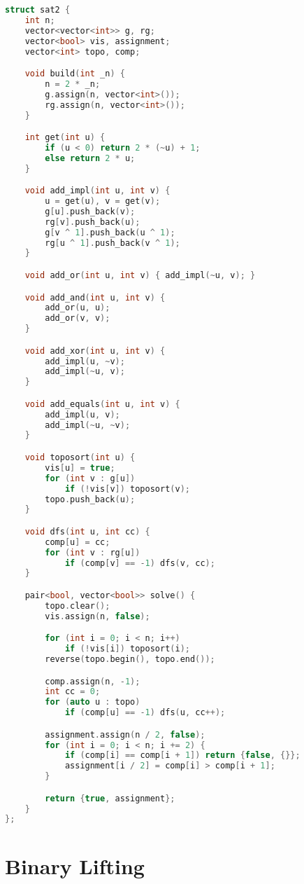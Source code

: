 \documentclass[10pt, a4paper, oneside]{book}
\begin{document}
\begin{lstlisting}[language=C++]
struct sat2 {
    int n;
    vector<vector<int>> g, rg;
    vector<bool> vis, assignment;
    vector<int> topo, comp;

    void build(int _n) {
        n = 2 * _n;
        g.assign(n, vector<int>());
        rg.assign(n, vector<int>());
    }

    int get(int u) {
        if (u < 0) return 2 * (~u) + 1;
        else return 2 * u;
    }

    void add_impl(int u, int v) {
        u = get(u), v = get(v);
        g[u].push_back(v);
        rg[v].push_back(u);
        g[v ^ 1].push_back(u ^ 1);
        rg[u ^ 1].push_back(v ^ 1);
    }

    void add_or(int u, int v) { add_impl(~u, v); }

    void add_and(int u, int v) {
        add_or(u, u);
        add_or(v, v);
    }

    void add_xor(int u, int v) {
        add_impl(u, ~v);
        add_impl(~u, v);
    }

    void add_equals(int u, int v) {
        add_impl(u, v);
        add_impl(~u, ~v);
    }

    void toposort(int u) {
        vis[u] = true;
        for (int v : g[u])
            if (!vis[v]) toposort(v);
        topo.push_back(u);
    }

    void dfs(int u, int cc) {
        comp[u] = cc;
        for (int v : rg[u])
            if (comp[v] == -1) dfs(v, cc);
    }

    pair<bool, vector<bool>> solve() {
        topo.clear();
        vis.assign(n, false);

        for (int i = 0; i < n; i++)
            if (!vis[i]) toposort(i);
        reverse(topo.begin(), topo.end());

        comp.assign(n, -1);
        int cc = 0;
        for (auto u : topo)
            if (comp[u] == -1) dfs(u, cc++);

        assignment.assign(n / 2, false);
        for (int i = 0; i < n; i += 2) {
            if (comp[i] == comp[i + 1]) return {false, {}};
            assignment[i / 2] = comp[i] > comp[i + 1];
        }

        return {true, assignment};
    }
};
\end{lstlisting}
\hfill

\section{Binary Lifting}
\end{document}
